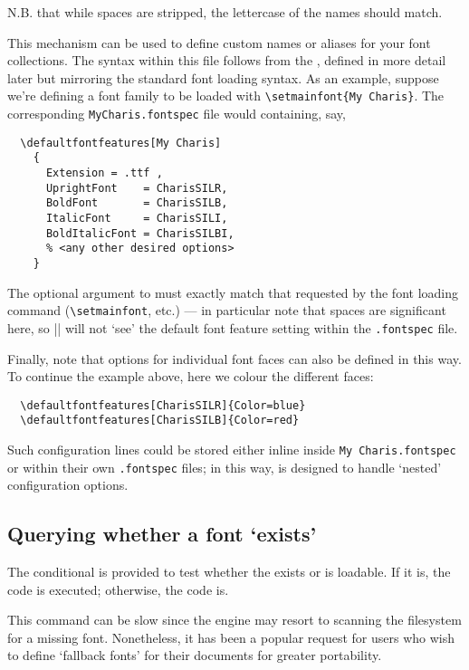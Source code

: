 \documentclass[a4paper]{l3doc}
\begin{document}
N.B. that while spaces are stripped, the lettercase of the names should match.

This mechanism can be used to define custom names or aliases for your font collections.
The syntax within this file follows from the , defined in more detail later but mirroring the standard  font loading syntax.
As an example, suppose we're defining a font family to be loaded with \verb|\setmainfont{My Charis}|.
The corresponding \texttt{MyCharis.fontspec} file would containing, say,
\begin{Verbatim}
  \defaultfontfeatures[My Charis]
    {
      Extension = .ttf ,
      UprightFont    = CharisSILR,
      BoldFont       = CharisSILB,
      ItalicFont     = CharisSILI,
      BoldItalicFont = CharisSILBI,
      % <any other desired options>
    }
\end{Verbatim}
The optional argument to  must exactly match that requested by the font loading command (\verb|\setmainfont|, etc.) --- in particular note that spaces are significant here, so |\setmainfont{MyCharis}| will not `see' the default font feature setting within the \texttt{.fontspec} file.

Finally, note that options for individual font faces can also be defined in this way.
To continue the example above, here we colour the different faces:
\begin{Verbatim}
  \defaultfontfeatures[CharisSILR]{Color=blue}
  \defaultfontfeatures[CharisSILB]{Color=red}
\end{Verbatim}
Such configuration lines could be stored either inline inside \texttt{My Charis.fontspec} or within their own \texttt{.fontspec} files; in this way,  is designed to handle `nested' configuration options.



\subsection{Querying whether a font `exists'}


The conditional  is provided to test whether the  exists or is loadable.
If it is, the  code is executed; otherwise, the  code is.

This command can be slow since the engine may resort to scanning the filesystem for a missing font.
Nonetheless, it has been a popular request for users who wish to define `fallback fonts' for their documents for greater portability.
\end{document}
